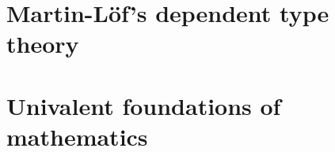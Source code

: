 \documentclass[11pt]{memoir} %
\begin{document}
\part{Martin-L\"of's dependent type theory}







\part{Univalent foundations of mathematics}










\end{document}
